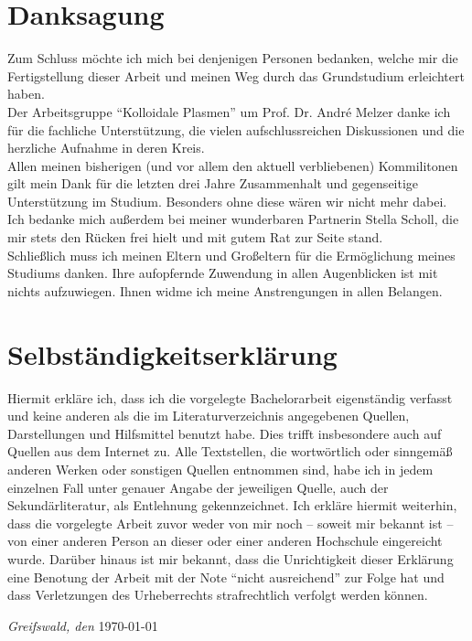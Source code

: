 \documentclass[numbers=noenddot,a4paper,notitlepage,twoside,BCOR15mm]{scrbook}
\newcommand{\tilt}[1]{\textit{#1}}
\begin{document}
		
		

	\chapter*{Danksagung}

		Zum Schluss möchte ich mich bei denjenigen Personen bedanken, welche mir die Fertigstellung dieser Arbeit und meinen Weg durch das Grundstudium erleichtert haben.\\
		Der Arbeitsgruppe "`Kolloidale Plasmen"' um Prof. Dr. André Melzer danke ich für die fachliche Unterstützung, die vielen aufschlussreichen Diskussionen und die herzliche Aufnahme in deren Kreis. \\
		Allen meinen bisherigen (und vor allem den aktuell verbliebenen) Kommilitonen gilt mein Dank für die letzten drei Jahre Zusammenhalt und gegenseitige Unterstützung im Studium. Besonders ohne diese wären wir nicht mehr dabei.\\
		Ich bedanke mich außerdem bei meiner wunderbaren Partnerin Stella Scholl, die mir stets den Rücken frei hielt und mit gutem Rat zur Seite stand.\\
		Schließlich muss ich meinen Eltern und Großeltern für die Ermöglichung meines Studiums danken. Ihre aufopfernde Zuwendung in allen Augenblicken ist mit nichts aufzuwiegen. Ihnen widme ich meine Anstrengungen in allen Belangen.

	\chapter*{Selbständigkeitserklärung}

	Hiermit erkläre ich, dass ich die vorgelegte Bachelorarbeit eigenständig verfasst und keine anderen als die im Literaturverzeichnis angegebenen Quellen, Darstellungen und Hilfsmittel benutzt habe. Dies trifft insbesondere auch auf Quellen aus dem Internet zu. Alle Textstellen, die wortwörtlich oder sinngemäß anderen Werken oder sonstigen Quellen entnommen sind, habe ich in jedem einzelnen Fall unter genauer Angabe der jeweiligen Quelle, auch der Sekundärliteratur, als Entlehnung gekennzeichnet. Ich erkläre hiermit weiterhin, dass die vorgelegte Arbeit zuvor weder von mir noch – soweit mir bekannt ist – von einer anderen Person an dieser oder einer anderen Hochschule eingereicht wurde. Darüber hinaus ist mir bekannt, dass die Unrichtigkeit dieser Erklärung eine Benotung der Arbeit mit der Note "`nicht ausreichend"' zur Folge hat und dass Verletzungen des Urheberrechts strafrechtlich verfolgt werden können.

		\vspace{3cm}

	\begin{flushright}
		\tilt{Greifswald, den} \today
	\end{flushright}
\end{document}
